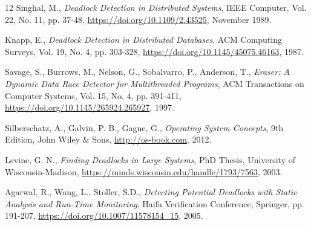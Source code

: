 \begin{thebibliography}{12}
  Singhal, M.,
  \emph{Deadlock Detection in Distributed Systems},
  IEEE Computer, Vol. 22, No. 11, pp. 37-48,
  \url{https://doi.org/10.1109/2.43525}, November 1989.

  Knapp, E.,
  \emph{Deadlock Detection in Distributed Databases},
  ACM Computing Surveys, Vol. 19, No. 4, pp. 303-328,
  \url{https://doi.org/10.1145/45075.46163}, 1987.

  Savage, S., Burrows, M., Nelson, G., Sobalvarro, P., Anderson, T.,
  \emph{Eraser: A Dynamic Data Race Detector for Multithreaded Programs},
  ACM Transactions on Computer Systems, Vol. 15, No. 4, pp. 391-411,
  \url{https://doi.org/10.1145/265924.265927}, 1997.

  Silberschatz, A., Galvin, P. B., Gagne, G.,
  \emph{Operating System Concepts},
  9th Edition, John Wiley \& Sons,
  \url{http://os-book.com}, 2012.

  Levine, G. N.,
  \emph{Finding Deadlocks in Large Systems},
  PhD Thesis, University of Wisconsin-Madison,
  \url{https://minds.wisconsin.edu/handle/1793/7563}, 2003.

  Agarwal, R., Wang, L., Stoller, S.D.,
  \emph{Detecting Potential Deadlocks with Static Analysis and Run-Time Monitoring},
  Haifa Verification Conference, Springer, pp. 191-207,
  \url{https://doi.org/10.1007/11578154_15}, 2005.
\end{thebibliography}
% 
